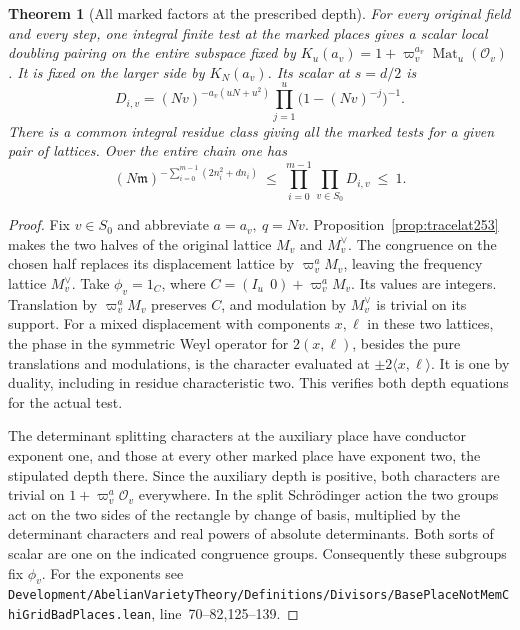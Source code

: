 \documentclass[a4paper,11pt]{article}
\newtheorem{theorem}[proposition]{Theorem}
\theoremstyle{definition}
\theoremstyle{remark}
\newcommand{\srcloc}[2]{{\small\nolinkurl{#1.lean}}, line~#2}
\numberwithin{equation}{section}
\begin{document}
\begin{theorem}[All marked factors at the prescribed depth]\leavevmode
\label{thm:markedcore253}
For every original field and every step, one integral finite test
at the marked places gives a scalar local doubling pairing on the
entire subspace fixed by \(K_u(a_v)=1+\varpi_v^{a_v}
\operatorname{Mat}_u(\mathcal O_v)\).
It is fixed on the larger side by \(K_N(a_v)\). Its scalar at
\(s=d/2\) is
\[
 D_{i,v}=(Nv)^{-a_v(uN+u^2)}
                   \prod_{j=1}^{u}\big(1-(Nv)^{-j}\big)^{-1}.
\]
There is a common integral residue class giving all the marked
tests for a given pair of lattices. Over the entire chain one has
\[
 (N\mathfrak m)^{-\sum_{i=0}^{m-1}(2n_i^2+d n_i)}
           \ \le\ \prod_{i=0}^{m-1}\prod_{v\in S_0}D_{i,v}
           \ \le\ 1 .
\]
\end{theorem}
\begin{proof}
Fix \(v\in S_0\) and abbreviate \(a=a_v,\ q=Nv\).
Proposition~\ref{prop:tracelat253} makes the two halves of the
original lattice \(M_v\) and \(M_v^\vee\). The congruence on the
chosen half replaces its displacement lattice by \(\varpi_v^a M_v\),
leaving the frequency lattice \(M_v^\vee\). Take
\(\phi_v=1_C\), where \(C=(I_u\ \ 0)+\varpi_v^a M_v\).
Its values are integers. Translation by \(\varpi_v^a M_v\)
preserves \(C\), and modulation by \(M_v^\vee\) is trivial on
its support. For a mixed displacement with components \(x,\ell\)
in these two lattices, the phase in the symmetric Weyl operator
for \(2(x,\ell)\), besides the pure translations and modulations,
is the character evaluated at \(\pm2\langle x,\ell\rangle\).
It is one by duality, including in residue characteristic two.
This verifies both depth equations for the actual test.

The determinant splitting characters at the auxiliary place have
conductor exponent one, and those at every other marked place
have exponent two, the stipulated depth there. Since the
auxiliary depth is positive, both characters are trivial on
\(1+\varpi_v^a\mathcal O_v\) everywhere. In the split
Schr\"odinger action the two groups act on the two sides of
the rectangle by change of basis, multiplied by the determinant
characters and real powers of absolute determinants. Both sorts
of scalar are one on the indicated congruence groups.
Consequently these subgroups fix \(\phi_v\).
For the exponents see
\srcloc{Development/AbelianVarietyTheory/Definitions/Divisors/BasePlaceNotMemChiGridBadPlaces}{70--82,125--139}.


\end{proof}
\end{document}
